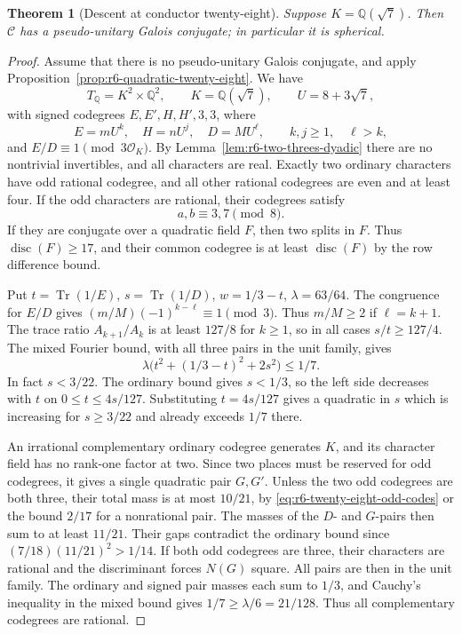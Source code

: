 \documentclass[11pt,reqno]{amsart}
\newtheorem{theorem}{Theorem}[section]
\theoremstyle{remark}\newtheorem{remark}[theorem]{Remark}
\numberwithin{equation}{section}
\begin{document}
\begin{theorem}[Descent at conductor twenty-eight]
\label{thm:r6-quadratic-twenty-eight}
Suppose $K=\mathbb Q(\sqrt7)$.  Then $\mathcal C$ has a pseudo-unitary Galois conjugate;
in particular it is spherical.
\end{theorem}
\begin{proof}
Assume that there is no pseudo-unitary Galois conjugate, and apply Proposition~\ref{prop:r6-quadratic-twenty-eight}.
We have
\[
 T_{\mathbb Q}=K^2\times\mathbb Q^2,
 \qquad K=\mathbb Q(\sqrt7),\qquad U=8+3\sqrt7,
\]
with signed codegrees $E,E',H,H',3,3$, where
\[
 E=mU^k,\quad H=nU^j,\quad D=MU^\ell,
 \qquad k,j\ge1,\quad \ell>k,
\]
and $E/D\equiv1\pmod{3\mathcal O_K}$.
By Lemma~\ref{lem:r6-two-threes-dyadic} there are no nontrivial
invertibles, and all characters are real. Exactly two ordinary
characters have odd rational codegree, and all other rational
codegrees are even and at least four. If the odd characters are rational,
their codegrees satisfy
\begin{equation}\label{eq:r6-twenty-eight-odd-codes}
                        a,b\equiv3,7\pmod8.
\end{equation}
If they are conjugate over a quadratic field $F$, then two splits in
$F$. Thus $\operatorname{disc}(F)\ge17$, and their common codegree
is at least $\operatorname{disc}(F)$ by the row difference bound.

Put $t=\operatorname{Tr}(1/E)$, $s=\operatorname{Tr}(1/D)$,
$w=1/3-t$, $\lambda=63/64$. The congruence for $E/D$ gives
$(m/M)(-1)^{k-\ell}\equiv1\pmod3$. Thus $m/M\ge2$ if
$\ell=k+1$. The trace ratio $A_{k+1}/A_k$ is at least $127/8$ for
$k\ge1$, so in all cases $s/t\ge127/4$.
The mixed Fourier bound, with all three pairs in the unit family, gives
\begin{equation}\label{eq:r6-twenty-eight-strong-mass}
       \lambda\bigl(t^2+(1/3-t)^2+2s^2\bigr)\le1/7.
\end{equation}
In fact $s<3/22$. The ordinary bound gives $s<1/3$, so the
left side decreases with $t$ on $0\le t\le4s/127$.
Substituting $t=4s/127$ gives a quadratic in $s$ which is
increasing for $s\ge3/22$ and already exceeds $1/7$ there.

An irrational complementary ordinary codegree generates $K$, and its
character field has no rank-one factor at two. Since two places must
be reserved for odd codegrees, it gives a single quadratic pair $G,G'$.
Unless the two odd codegrees are both three, their total mass is at most
$10/21$, by \eqref{eq:r6-twenty-eight-odd-codes} or the bound $2/17$
for a nonrational pair. The masses of the $D$- and $G$-pairs then sum
to at least $11/21$. Their gaps contradict the ordinary bound since
$(7/18)(11/21)^2>1/14$. If both odd codegrees are three, their
characters are rational and the discriminant forces $N(G)$ square.
All pairs are then in the unit family. The ordinary and signed pair
masses each sum to $1/3$, and Cauchy's inequality in the mixed bound
gives $1/7\ge\lambda/6=21/128$. Thus all complementary codegrees are rational.


\end{proof}
\end{document}
